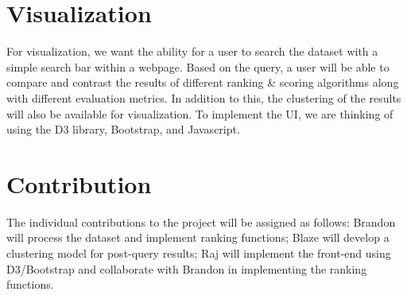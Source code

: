 \documentclass[sigconf]{acmart}
\begin{document}
\section{Visualization}
	For visualization, we want the ability for a user to search the dataset with a simple search bar within a webpage. Based on the query, a user will be able to compare and contrast the results of different ranking \& scoring algorithms along with different evaluation metrics. In addition to this, the clustering of the results will also be available for visualization. To implement the UI, we are thinking of using the D3 library, Bootstrap, and Javascript. 

\section{Contribution}
The individual contributions to the project will be assigned as follows: Brandon will process the dataset and implement ranking functions; Blaze will develop a clustering model for post-query results; Raj will implement the front-end using D3/Bootstrap and collaborate with Brandon in implementing the ranking functions.



\end{document}
